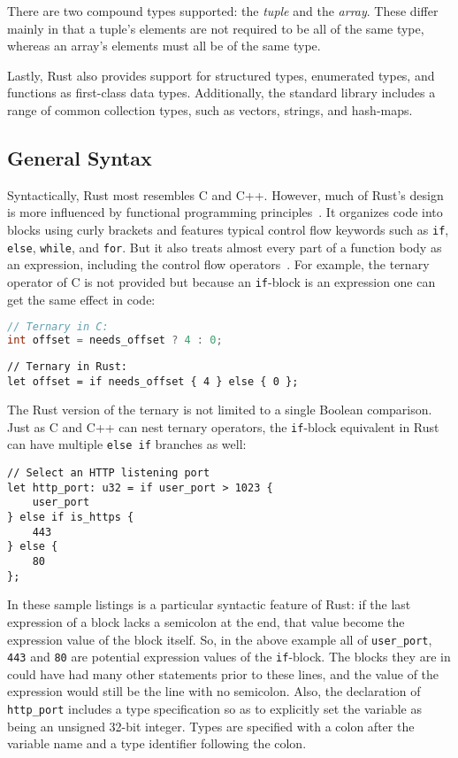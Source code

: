 There are two compound types supported: the \textit{tuple} and the \textit{array}. These differ mainly in that a tuple's elements are not required to be all of the same type, whereas an array's elements must all be of the same type.

Lastly, Rust also provides support for structured types, enumerated types, and functions as first-class data types. Additionally, the standard library includes a range of common collection types, such as vectors, strings, and hash-maps.

\subsection{General Syntax}

Syntactically, Rust most resembles C and C++. However, much of Rust's design is more influenced by functional programming principles~\cite[Chapter~13]{rpl.2019}. It organizes code into blocks using curly brackets and features typical control flow keywords such as \texttt{if}, \texttt{else}, \texttt{while}, and \texttt{for}. But it also treats almost every part of a function body as an expression, including the control flow operators~\cite[Chapter~6]{programming.rust.2021}. For example, the ternary operator of C is not provided but because an \texttt{if}-block is an expression one can get the same effect in code:

\begin{lstlisting}[language=C]
// Ternary in C:
int offset = needs_offset ? 4 : 0;
\end{lstlisting}

\begin{lstlisting}
// Ternary in Rust:
let offset = if needs_offset { 4 } else { 0 };
\end{lstlisting}

The Rust version of the ternary is not limited to a single Boolean comparison. Just as C and C++ can nest ternary operators, the \texttt{if}-block equivalent in Rust can have multiple \texttt{else if} branches as well:

\begin{lstlisting}
// Select an HTTP listening port
let http_port: u32 = if user_port > 1023 {
    user_port
} else if is_https {
    443
} else {
    80
};
\end{lstlisting}

In these sample listings is a particular syntactic feature of Rust: if the last expression of a block lacks a semicolon at the end, that value become the expression value of the block itself. So, in the above example all of \texttt{user\_port}, \texttt{443} and \texttt{80} are potential expression values of the \texttt{if}-block. The blocks they are in could have had many other statements prior to these lines, and the value of the expression would still be the line with no semicolon. Also, the declaration of \texttt{http\_port} includes a type specification so as to explicitly set the variable as being an unsigned 32-bit integer. Types are specified with a colon after the variable name and a type identifier following the colon.

